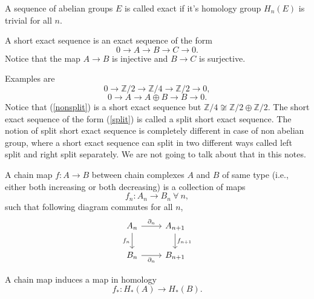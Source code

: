 \begin{definition}
	A sequence of abelian groups \(E\) is called exact if it's homology group \(H_n(E)\) is trivial for all \(n\).
	
	A short exact sequence is an exact sequence of the form 
	\[0 \to A \to B \to C \to 0.\]
	Notice that the map \(A \to B\) is injective and \(B \to C\) is surjective.
\end{definition}
Examples are
\begin{equation}
	\label{nonsplit}
	0 \to \mathbb{Z}/2 \to \mathbb Z/4 \to \mathbb{Z}/2 \to 0,
\end{equation}
\begin{equation}
	\label{split}
	0 \to A \to A \oplus B \to B \to 0.
\end{equation}
Notice that (\ref{nonsplit}) is a short exact sequence but \(\mathbb{Z}/4 \not\cong \mathbb Z/2 \oplus \mathbb{Z}/2\).
The short exact sequence of the form (\ref{split}) is called a split short exact sequence.
The notion of split short exact sequence is completely different in case of non abelian group,	 where a short exact sequence can split in two different ways called left split and right split separately.
We are not going to talk about that in this notes.

\begin{definition}
	A chain map \(f: A \to B\) between chain complexes \(A\) and \(B\) of same type (i.e., either both increasing or both decreasing) is a collection of maps
	\[f_n: A_n \to B_n \ \forall\ n,\]
	such that following diagram commutes for all \(n\),
	\[\begin{tikzcd} 
		A_n \ar{r}{\partial_n} \ar{d}[swap]{f_n} & A_{n+1} \ar{d}{f_{n+1}} \\ 
		B_n \ar{r}[swap]{\partial_n} & B_{n+1} 
	  \end{tikzcd}\]
\end{definition}
A chain map induces a map in homology 
\[f_\ast: H_\ast(A) \to H_\ast(B).\]

